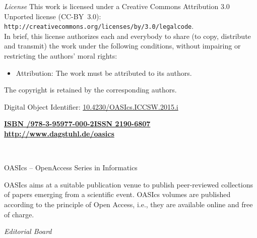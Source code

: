 \documentclass[a4paper,UKenglish]{oasicsmaster}
\begin{document}
\begin{publicationinfo}
\emph{License}\newline
This work is licensed under a Creative Commons Attribution 3.0 Unported license (CC-BY~3.0): \texttt{http://creativecommons.org/licenses/by/3.0/legalcode}.\\
In brief, this license authorizes each and everybody to share (to copy, distribute and transmit) the work under the following conditions, without impairing or restricting the authors' moral rights:

\begin{itemize}
\item Attribution: The work must be attributed to its authors.
\end{itemize}

\smallskip

The copyright is retained by the corresponding authors.

\bigskip
\bigskip
\bigskip
\bigskip

Digital Object Identifier: \href{http://dx.doi.org/10.4230/OASIcs.ICCSW.2015.i}{10.4230/OASIcs.ICCSW.2015.i}

\vfill
\textbf{\href{http://www.dagstuhl.de/dagpub//978-3-95977-000-2}{ISBN /978-3-95977-000-2}}\qquad \qquad \textbf{\href{http://drops.dagstuhl.de/oasics}{ISSN 2190-6807}}  \hfill \textbf{\href{http://www.dagstuhl.de/oasics}{http://www.dagstuhl.de/oasics}}


  
 \newpage

\ \\
\bigskip
\bigskip
\bigskip

{\Large OASIcs -- OpenAccess Series in Informatics}
 
 \bigskip
OASIcs aims at a suitable publication venue to publish peer-reviewed collections of papers emerging from a scientific event.
OASIcs volumes are published according to the principle of Open Access, i.e., they are available online and free of charge. 

 
 \bigskip
 \bigskip
 \bigskip
 
 
\emph{Editorial Board}


\end{publicationinfo}
\end{document}
